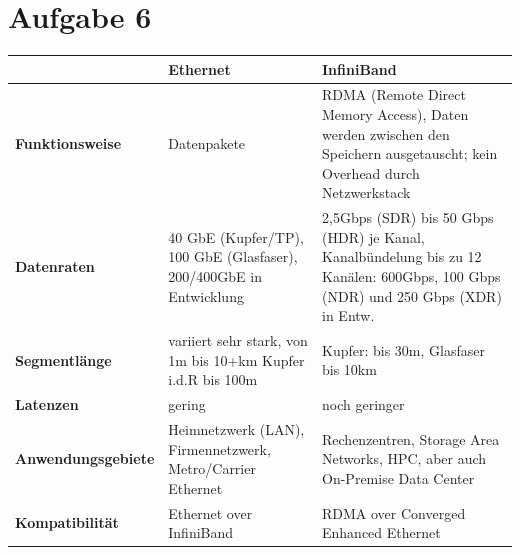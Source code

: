 \documentclass{article}
\begin{document}
	\section*{Aufgabe 6}
	\begin{center}
		\begin{tabular}{L{4cm}|L{5cm}|L{5cm}}
			 & \textbf{Ethernet} & \textbf{InfiniBand} \\
			 \hline
			 \textbf{Funktionsweise} & Datenpakete & RDMA (Remote Direct Memory Access), Daten werden zwischen den Speichern ausgetauscht; kein Overhead durch Netzwerkstack \\
			 \hline
			 \textbf{Datenraten} & 40 GbE (Kupfer/TP), 100 GbE (Glasfaser), 200/400GbE in Entwicklung & 2,5Gbps (SDR) bis 50 Gbps (HDR) je Kanal, Kanalbündelung bis zu 12 Kanälen: 600Gbps, 100 Gbps (NDR) und 250 Gbps (XDR) in Entw. \\
			 \hline
			 \textbf{Segmentlänge} & variiert sehr stark, von 1m bis 10+km Kupfer i.d.R bis 100m & Kupfer: bis 30m, Glasfaser bis 10km \\
			 \hline
			 \textbf{Latenzen} & gering & noch geringer \\
			 \hline
			 \textbf{Anwendungsgebiete} & Heimnetzwerk (LAN), Firmennetzwerk, Metro/Carrier Ethernet & Rechenzentren, Storage Area Networks, HPC, aber auch On-Premise Data Center \\
			 \hline
			 \textbf{Kompatibilität} & Ethernet over InfiniBand & RDMA over Converged Enhanced Ethernet
		\end{tabular}
	\end{center}
	
\end{document}

